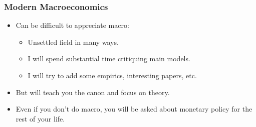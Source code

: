 \documentclass[english,xcolor=svgnames]{beamer}
\begin{document}
\begin{frame}
\frametitle{Modern Macroeconomics}
\begin{itemize}
	\item Can be difficult to appreciate macro:
	\begin{itemize}
		\item Unsettled field in many ways.
		\item I will spend substantial time critiquing main models.
		\item I will try to add some empirics, interesting papers, etc.
	\end{itemize}
	\item But will teach you the canon and focus on theory.
	\item Even if you don't do macro, you will be asked about monetary policy for the rest of your life.
\end{itemize}	
\end{frame}
\end{document}
